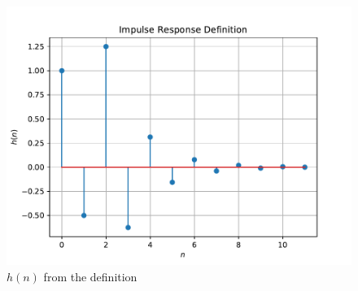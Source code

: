 \documentclass[journal,12pt,twocolumn]{IEEEtran}
\renewcommand\thesection{\arabic{section}}
\begin{document}
\begin{enumerate}[label=\thesection.\arabic*]
\begin{lstlisting}
	\end{lstlisting}
	\begin{figure}[!ht]
		\centering
		\includegraphics[width=\columnwidth]{./figs/hndef}
		\caption{$h(n)$ from the definition}
		\label{fig:hndef}
	\end{figure}
	

\end{enumerate}
\end{document}
